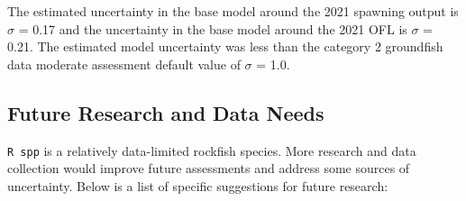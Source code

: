 \documentclass[11pt,
  english,
  a4paper,
]{article}
\begin{document}
\leavevmode\tagmcend\tagstructend


The estimated uncertainty in the base model around the 2021 spawning output is {\(\sigma\)\leavevmode\tagmcend\tagstructend} = 0.17 and the uncertainty in the base model around the 2021 OFL is {\(\sigma\)\leavevmode\tagmcend\tagstructend} = 0.21. The estimated model uncertainty was less than the category 2 groundfish data moderate assessment default value of {\(\sigma\)\leavevmode\tagmcend\tagstructend} = 1.0.

\leavevmode\tagmcend\tagstructend\par


\hypertarget{future-research-and-data-needs}{%
\subsection{Future Research and Data Needs}\label{future-research-and-data-needs}}

\leavevmode\tagmcend\tagstructend


\texttt{R\ spp} is a relatively data-limited rockfish species. More research and data collection would improve future assessments and address some sources of uncertainty. Below is a list of specific suggestions for future research:

\leavevmode\tagmcend\tagstructend\par

\end{document}
